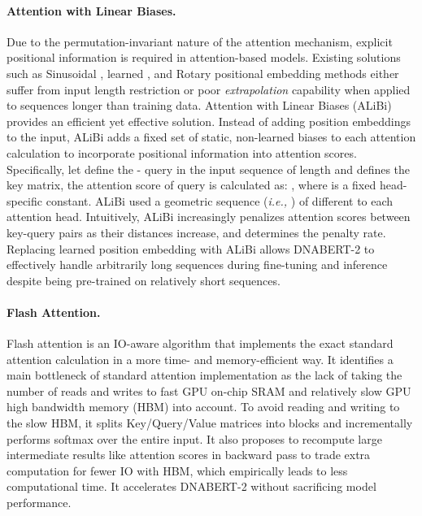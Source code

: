 \documentclass{article}
\begin{document}
\paragraph{Attention with Linear Biases. } Due to the permutation-invariant nature of the attention mechanism, explicit positional information is required in attention-based models. Existing solutions such as Sinusoidal \citep{transformer}, learned \citep{bert}, and Rotary \citep{su2021roformer} positional embedding methods either suffer from input length restriction or poor \textit{extrapolation} capability when applied to sequences longer than training data. Attention with Linear Biases (ALiBi) provides an efficient yet effective solution. Instead of adding position embeddings to the input, ALiBi adds a fixed set of static, non-learned biases to each attention calculation to incorporate positional information into attention scores. 
Specifically, let  define the - query in the input sequence of length  and  defines the key matrix, the attention score of query  is calculated as: , where  is a fixed head-specific constant. ALiBi used a geometric sequence (\textit{i.e.,} ) of different  to each attention head. Intuitively, ALiBi increasingly penalizes attention scores between key-query pairs as their distances increase, and  determines the penalty rate. 
Replacing learned position embedding with ALiBi allows DNABERT-2 to effectively handle arbitrarily long sequences during fine-tuning and inference despite being pre-trained on relatively short sequences.


\paragraph{Flash Attention.} Flash attention is an IO-aware algorithm that implements the exact standard attention calculation in a more time- and memory-efficient way. It identifies a main bottleneck of standard attention implementation as the lack of taking the number of reads and writes to fast GPU on-chip SRAM and relatively slow GPU high bandwidth memory (HBM) into account. To avoid reading and writing to the slow HBM, it splits Key/Query/Value matrices into blocks and incrementally performs softmax over the entire input. It also proposes to recompute large intermediate results like attention scores in backward pass to trade extra computation for fewer IO with HBM, which empirically leads to less computational time. It accelerates DNABERT-2 without sacrificing model performance.
\end{document}

